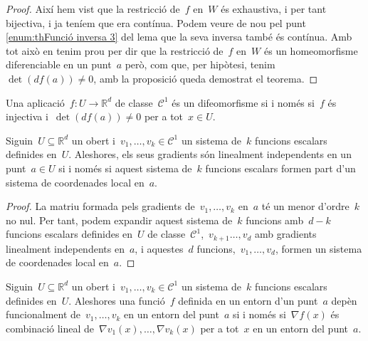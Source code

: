 \documentclass[../../main.tex]{subfiles}
\begin{document}
\begin{proof}
        Així hem vist que la restricció de~\(f\) en~\(W\) és exhaustiva, i per tant bijectiva, i ja teníem que era contínua.
        Podem veure de nou pel punt \eqref{enum:thFunció inversa 3} del lema  que la seva inversa també és contínua.
        Amb tot això en tenim prou per dir que la restricció de~\(f\) en~\(W\) és un homeomorfisme diferenciable en un punt~\(a\) però, com que, per hipòtesi, tenim~\(\det(df(a))\neq0\), amb la proposició  queda demostrat el teorema.
    \end{proof}
    \begin{corollary} %
        \label{cor:difeomorfisme és equivalent a ser injectiva i tenir diferencial amb determinant no nul}
        Una aplicació~\(f\colon U\to \mathbb{R}^{d}\) de classe~\(\mathcal{C}^{1}\) és un difeomorfisme si i només si~\(f\) és injectiva i~\(\det(df(a))\neq0\) per a tot~\(x\in U\).
    \end{corollary}
    \begin{proposition}
        Siguin~\(U\subseteq\mathbb{R}^{d}\) un obert i~\(v_{1},\dots,v_{k}\in\mathcal{C}^{1}\) un sistema de~\(k\) funcions escalars definides en~\(U\).
        Aleshores, els seus gradients són linealment independents en un punt~\(a\in U\) si i només si aquest sistema de~\(k\) funcions escalars formen part d'un sistema de coordenades local en~\(a\).
    \end{proposition}
    \begin{proof}
        La matriu formada pels gradients de~\(v_{1},\dots,v_{k}\) en~\(a\) té un menor d'ordre~\(k\) no nul.
        Per tant, podem expandir aquest sistema de~\(k\) funcions amb~\(d-k\) funcions escalars definides en~\(U\) de classe~\(\mathcal{C}^{1}\),~\(v_{k+1}\dots,v_{d}\) amb gradients linealment independents en~\(a\), i aquestes~\(d\) funcions,~\(v_{1},\dots,v_{d}\), formen un sistema de coordenades local en~\(a\).
    \end{proof}
    \begin{corollary}\label{corollary:dependència funcional iff dependència lineal dels gradients}
        Siguin~\(U\subseteq\mathbb{R}^{d}\) un obert i~\(v_{1},\dots,v_{k}\in\mathcal{C}^{1}\) un sistema de~\(k\) funcions escalars definides en~\(U\).
        Aleshores una funció~\(f\) definida en un entorn d'un punt~\(a\) depèn funcionalment de~\(v_{1},\dots,v_{k}\) en un entorn del punt~\(a\) si i només si~\(\nabla f(x)\) és combinació lineal de~\(\nabla v_{1}(x),\dots,\nabla v_{k}(x)\) per a tot~\(x\) en un entorn del punt~\(a\).
    \end{corollary}
\end{document}

